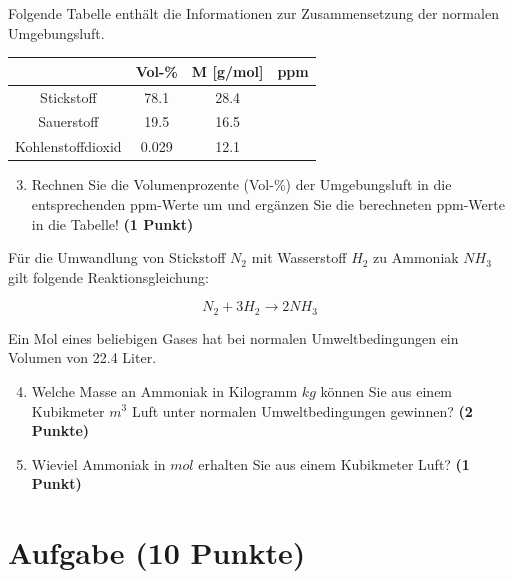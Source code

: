 \documentclass[a4paper, 9pt]{scrartcl}\usepackage[]{graphicx}\usepackage[]{xcolor}
\begin{document}
Folgende Tabelle enth{\"a}lt die Informationen zur Zusammensetzung der
normalen Umgebungsluft.

\begin{center}
  \begin{tabular}{ c|c|c|c }
     & Vol-\% & M [g/mol] & ppm \\
    \hline
    Stickstoff & 78.1 & 28.4 &
                                                    \phantom{1000000000000}\strut\\
        \hline
    Sauerstoff & 19.5 & 16.5 &
                                                    \phantom{10000000}\strut\\
        \hline
    Kohlenstoffdioxid & 0.029 & 12.1 & \phantom{10000000}\strut\\     
     \hline
\end{tabular}
\end{center}

\begin{enumerate}
   \setcounter{enumi}{2}
\item Rechnen Sie die Volumenprozente (Vol-\%) der Umgebungsluft in die
  entsprechenden ppm-Werte um und erg{\"a}nzen Sie die berechneten ppm-Werte in
  die Tabelle!  \textbf{(1 Punkt)}
\end{enumerate}

F{\"u}r die Umwandlung von Stickstoff $N_2$ mit Wasserstoff $H_2$ zu Ammoniak
$NH_3$ gilt folgende Reaktionsgleichung:

\begin{equation*}
  N_2 + 3H_2 \rightarrow 2NH_3
\end{equation*}  

Ein Mol eines beliebigen Gases hat bei normalen Umweltbedingungen ein
Volumen von 22.4 Liter. %

\begin{enumerate}
  \setcounter{enumi}{3}
\item Welche Masse an Ammoniak in Kilogramm $kg$ k{\"o}nnen Sie aus einem
  Kubikmeter $m^3$ Luft unter normalen Umweltbedingungen gewinnen?
  \textbf{(2 Punkte)}
\item Wieviel Ammoniak in $mol$ erhalten Sie aus einem Kubikmeter Luft?
  \textbf{(1 Punkt)}
\end{enumerate}

 
\clearpage

\section{Aufgabe \hfill (10 Punkte)}
\end{document}
